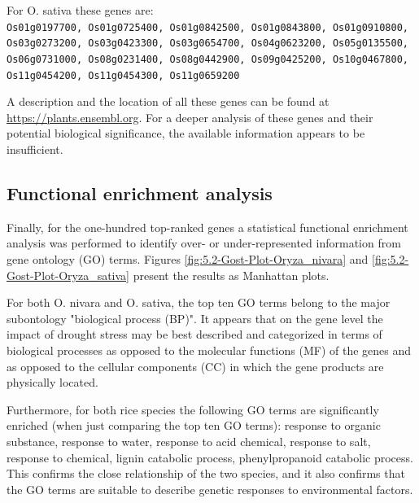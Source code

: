For O. sativa these genes are:\\
{\scriptsize\texttt{Os01g0197700, Os01g0725400, Os01g0842500, Os01g0843800, Os01g0910800, Os03g0273200, Os03g0423300, Os03g0654700, Os04g0623200, Os05g0135500, Os06g0731000, Os08g0231400, Os08g0442900, Os09g0425200, Os10g0467800, Os11g0454200, Os11g0454300, Os11g0659200
}}

A description and the location of all these genes can be found at \url{https://plants.ensembl.org}. For a deeper analysis of these genes and their potential biological significance, the available information appears to be insufficient.


\subsection{Functional enrichment analysis}

Finally, for the one-hundred top-ranked genes a statistical functional enrichment analysis was performed to identify over- or under-represented information from gene ontology (GO) terms. Figures \ref{fig:5.2-Gost-Plot-Oryza_nivara} and \ref{fig:5.2-Gost-Plot-Oryza_sativa} present the results as Manhattan plots.

For both O. nivara and O. sativa, the top ten GO terms belong to the major subontology "biological process (BP)". It appears that on the gene level the impact of drought stress may be best described and categorized in terms of biological processes as opposed to the molecular functions (MF) of the genes and as opposed to the cellular components (CC) in which the gene products are physically located.

Furthermore, for both rice species the following GO terms are significantly enriched (when just comparing the top ten GO terms): response to organic substance, response to water, response to acid chemical, response to salt, response to chemical, lignin catabolic process, phenylpropanoid catabolic process. This confirms the close relationship of the two species, and it also confirms that the GO terms are suitable to describe genetic responses to environmental factors.

